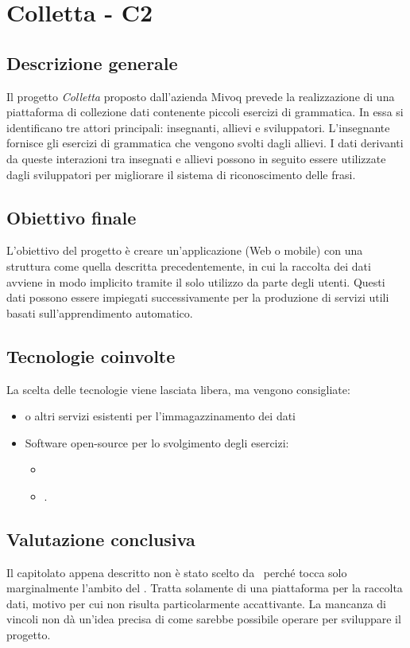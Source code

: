 \section{Colletta - C2} \label{c2}
    \subsection{Descrizione generale}
    Il progetto \textit{Colletta} proposto dall'azienda Mivoq prevede la realizzazione di una piattaforma di collezione dati contenente piccoli esercizi di grammatica.
    In essa si identificano tre attori principali: insegnanti, allievi e sviluppatori. L'insegnante fornisce gli esercizi di grammatica che vengono svolti dagli allievi.
    I dati derivanti da queste interazioni tra insegnati e allievi possono in seguito essere utilizzate dagli sviluppatori per migliorare il sistema di riconoscimento delle frasi.

    \subsection{Obiettivo finale}
    L'obiettivo del progetto è creare un'applicazione (Web o mobile) con una struttura come quella descritta precedentemente,
    in cui la raccolta dei dati avviene in modo implicito tramite il solo utilizzo da parte degli utenti. Questi dati possono essere impiegati successivamente per la produzione di
    servizi utili basati sull'apprendimento automatico.

    \subsection{Tecnologie coinvolte}
    La scelta delle tecnologie viene lasciata libera, ma vengono consigliate:
        \begin{itemize}
            \item {} o altri servizi esistenti per l'immagazzinamento dei dati
            \item Software open-source per lo svolgimento degli esercizi:
            \begin{itemize}
                \item {} 
                \item {}.
            \end{itemize}
        \end{itemize}

    \subsection{Valutazione conclusiva}
    Il capitolato appena descritto non è stato scelto da \gruppo\ perché tocca solo marginalmente l'ambito del .
    Tratta solamente di una piattaforma per la raccolta dati, motivo per cui non risulta particolarmente accattivante.
    La mancanza di vincoli non dà un'idea precisa di come sarebbe possibile operare per sviluppare il progetto.


